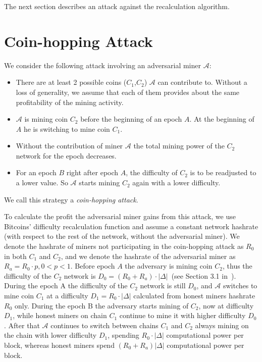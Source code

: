 \documentclass[]{llncs}
\newcommand{\texp}{|\Delta|}
\newcommand{\attackname}{coin-hopping attack}
\newcommand{\AttackName}{Coin-hopping Attack}
\newcommand{\coinA}{$C_1$}
\newcommand{\coinB}{$C_2$}
\begin{document}
The next section describes an attack against the recalculation algorithm.

\section{\AttackName}
\label{sec:attack}

We consider the following attack involving an adversarial miner $\mathcal{A}$:

\begin{itemize}
\item There are at least 2 possible coins (\coinA{},\coinB{}) $\mathcal{A}$ can contribute to. Without a loss of generality, we assume that each of them provides about the same profitability of the mining activity.
\item $\mathcal{A}$ is mining coin \coinB{} before the beginning of an epoch $A$. At the beginning of $A$ he is switching to mine coin \coinA{}.
\item Without the contribution of miner $\mathcal{A}$ the total mining power of the \coinB{} network for the epoch decreases.
\item For an epoch $B$ right after epoch $A$, the difficulty of \coinB{} is to be readjusted to a lower value. So $\mathcal{A}$ starts mining \coinB{} again with a lower difficulty.
\end{itemize}

We call this strategy a {\em \attackname{}}.

To calculate the profit the adversarial miner gains from this attack, we use Bitcoins' difficulty recalculation function and assume a  constant network hashrate (with respect to the rest of the network, without the adversarial miner).
We denote the hashrate of miners not participating in the coin-hopping attack as $R_0$ in both \coinA{} and \coinB{}, and we denote the hashrate of the adversarial miner as $R_a=R_0\cdot p, 0 < p < 1 $.
Before epoch $A$ the adversary is mining coin \coinB{}, thus the difficulty of the \coinB{} network  is $D_0 = (R_0+R_a) \cdot \texp$~(see Section 3.1 in~\cite{kraft2015difficulty}).
During the epoch A the difficulty of the \coinB{} network is still $D_0$, and $\mathcal{A}$ switches to mine coin \coinA{} at a difficulty $D_1 = R_0 \cdot \texp$  calculated from honest miners hashrate $R_0$ only.
During the epoch B the adversary starts mining of \coinB{}, now at difficulty $D_1$, while honest miners on chain \coinA{} continue to mine it with higher difficulty $D_0$.
After that $\mathcal{A}$ continues to switch between chains \coinA{} and \coinB{} always mining on the chain with lower difficulty $D_1$, spending $R_0 \cdot \texp$ computational power per block, whereas honest miners spend $(R_0+R_a) \texp$ computational power per block.
\end{document}
